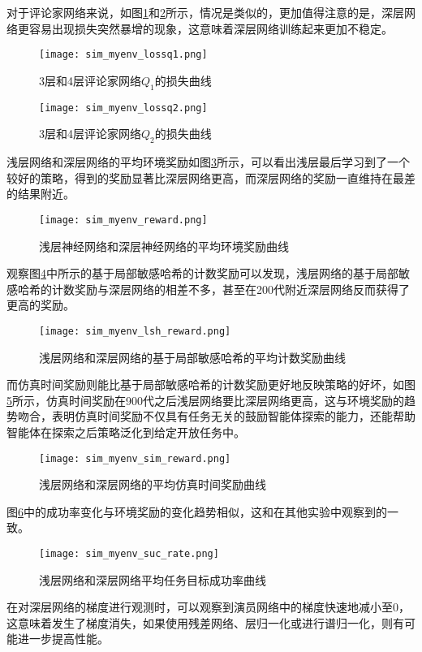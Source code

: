 对于评论家网络来说，如图\ref{simlossq1}和\ref{simlossq2}所示，情况是类似的，更加值得注意的是，深层网络更容易出现损失突然暴增的现象，这意味着深层网络训练起来更加不稳定。
        \begin{figure}
        \centering
        \texttt{[image: sim\_myenv\_lossq1.png]}
        \caption{3层和4层评论家网络$Q_1$的损失曲线}
            \label{simlossq1}
        \end{figure}

        \begin{figure}
        \centering
        \texttt{[image: sim\_myenv\_lossq2.png]}
        \caption{3层和4层评论家网络$Q_2$的损失曲线}
            \label{simlossq2}
        \end{figure}

浅层网络和深层网络的平均环境奖励如图\ref{simenv_reward}所示，可以看出浅层最后学习到了一个较好的策略，得到的奖励显著比深层网络更高，而深层网络的奖励一直维持在最差的结果附近。

        \begin{figure}
        \centering
        \texttt{[image: sim\_myenv\_reward.png]}
        \caption{浅层神经网络和深层神经网络的平均环境奖励曲线}
            \label{simenv_reward}
        \end{figure}

观察图\ref{simlsh_reward}中所示的基于局部敏感哈希的计数奖励可以发现，浅层网络的基于局部敏感哈希的计数奖励与深层网络的相差不多，甚至在200代附近深层网络反而获得了更高的奖励。

        \begin{figure}
        \centering
        \texttt{[image: sim\_myenv\_lsh\_reward.png]}
        \caption{浅层网络和深层网络的基于局部敏感哈希的平均计数奖励曲线}
            \label{simlsh_reward}
        \end{figure}
而仿真时间奖励则能比基于局部敏感哈希的计数奖励更好地反映策略的好坏，如图\ref{simsim_reward}所示，仿真时间奖励在900代之后浅层网络要比深层网络更高，这与环境奖励的趋势吻合，表明仿真时间奖励不仅具有任务无关的鼓励智能体探索的能力，还能帮助智能体在探索之后策略泛化到给定开放任务中。

        \begin{figure}
        \centering
        \texttt{[image: sim\_myenv\_sim\_reward.png]}
        \caption{浅层网络和深层网络的平均仿真时间奖励曲线}
            \label{simsim_reward}
        \end{figure}
图\ref{simsuc_rate}中的成功率变化与环境奖励的变化趋势相似，这和在其他实验中观察到的一致。

        \begin{figure}
        \centering
        \texttt{[image: sim\_myenv\_suc\_rate.png]}
        \caption{浅层网络和深层网络平均任务目标成功率曲线}
            \label{simsuc_rate}
        \end{figure}
在对深层网络的梯度进行观测时，可以观察到演员网络中的梯度快速地减小至0，这意味着发生了梯度消失，如果使用残差网络、层归一化或进行谱归一化，则有可能进一步提高性能。
